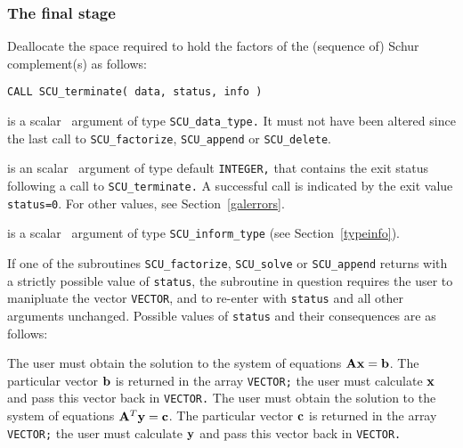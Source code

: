 \documentclass{galahad}
\newcommand{\packagename}{SCU}
\begin{document}

\subsubsection{The final stage}
Deallocate the space required to hold the factors of the
(sequence of) Schur complement(s) as follows:
\vspace*{1mm}

\hskip0.5in
{\tt CALL \packagename\_terminate( data, status, info )}

\vspace*{-2mm}
\begin{description}
 is a scalar \intentinout\ argument of type
{\tt \packagename\_data\_type.}
It must not have been altered since the last call to
{\tt \packagename\_factorize},
{\tt \packagename\_append} or {\tt \packagename\_delete}.

 is an scalar \intentout\ argument of type default
{\tt INTEGER,} that
contains the exit status following a call to {\tt \packagename\_terminate.}
A successful call is indicated by the exit value {\tt status=0}.
For other values, see Section~\ref{galerrors}.

 is a scalar \intentout\ argument of type
{\tt \packagename\_inform\_type}
(see Section~\ref{typeinfo}).


\end{description}


\galreverse
If one of the subroutines
{\tt \packagename\_factorize},
{\tt \packagename\_solve} or
{\tt \packagename\_append}
returns with a strictly possible value of {\tt status},
the subroutine in question requires the user to manipluate the vector
{\tt VECTOR}, and to re-enter with {\tt status} and all other arguments
unchanged.
Possible values of {\tt status} and their consequences are as follows:

\begin{description}
 The user must obtain the solution to the system of equations
$ {\mathbf{A}} {\mathbf{x}}  =  {\mathbf{b}}$.
The particular vector ${\mathbf{b}}$ is returned in the array {\tt VECTOR;}
the user must calculate ${\mathbf{x}}$ and pass this vector back in {\tt VECTOR.}
 The user must obtain the solution to the system of equations
$ {\mathbf{A}}^T {\mathbf{y}}  =  {\mathbf{c}}$.
The particular vector ${\mathbf{c}}$ is returned in the array {\tt VECTOR;}
the user must calculate ${\mathbf{y}}$ and pass this vector back in {\tt VECTOR.}
\end{description}
\end{document}
